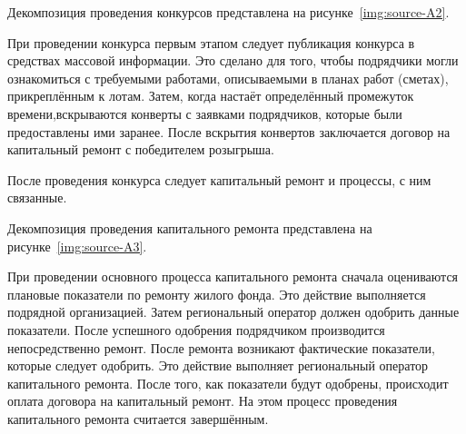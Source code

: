 Декомпозиция проведения конкурсов представлена на рисунке~\ref{img:source-A2}.


При проведении конкурса первым этапом следует публикация конкурса в средствах массовой информации.
Это сделано для того, чтобы подрядчики могли ознакомиться с требуемыми работами, описываемыми в планах работ (сметах), прикреплённым к лотам.
Затем, когда настаёт определённый промежуток времени,\linebreak вскрываются конверты с заявками подрядчиков, которые были предоставлены ими заранее.
После вскрытия конвертов заключается договор на капитальный ремонт с победителем розыгрыша.

После проведения конкурса следует капитальный ремонт и процессы, с ним связанные.

Декомпозиция проведения капитального ремонта представлена на рисунке~\ref{img:source-A3}.


При проведении основного процесса капитального ремонта сначала оцениваются плановые показатели по ремонту жилого фонда.
Это действие выполняется подрядной организацией.
Затем региональный оператор должен одобрить данные показатели.
После успешного одобрения подрядчиком производится непосредственно ремонт.
После ремонта возникают фактические показатели, которые следует одобрить.
Это действие выполняет региональный оператор капитального ремонта.
После того, как показатели будут одобрены, происходит оплата договора на капитальный ремонт.
На этом процесс проведения капитального ремонта считается завершённым.

\clearpage
\newpage